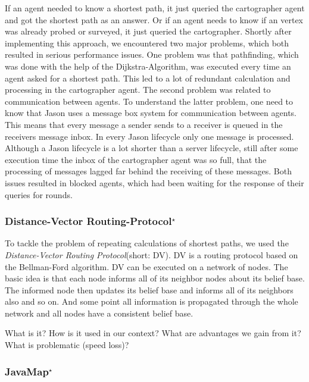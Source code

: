  If an agent needed to know a shortest path, it just queried the cartographer agent and got the shortest path as an answer. Or if an agent needs to know if an vertex was already probed or surveyed, it just queried the cartographer. Shortly after implementing this approach, we encountered two major problems, which both resulted in serious performance issues. One problem was that pathfinding, which was done with the help of the Dijkstra-Algorithm, was executed every time an agent asked for a shortest path. This led to a lot of redundant calculation and processing in the cartographer agent. The second problem was related to communication between agents. To understand the latter problem, one need to know that Jason uses a message box system for communication between agents. This means that every message a sender sends to a receiver is queued in the receivers message inbox. In every Jason lifecycle only one message is processed. Although a Jason lifecycle is a lot shorter than a server lifecycle, still after some execution time the inbox of the cartographer agent was so full, that the processing of messages lagged far behind the receiving of these messages. Both issues resulted in blocked agents, which had been waiting for the response of their queries for rounds.


\subsubsection[Distance-Vector Routing Protocol]{Distance-Vector Routing-Protocol$^\star$}\label{alg:map_dv}
To tackle the problem of repeating calculations of shortest paths, we used the \emph{Distance-Vector Routing Protocol}\cite{wiki:dvrp}(short: DV). DV is a routing protocol based on the Bellman-Ford algorithm\cite{wiki:bellman_ford}. DV can be executed on a network of nodes. The basic idea is that each node informs all of its neighbor nodes about its belief base. The informed node then updates its belief base and informs all of its neighbors also and so on. And some point all information is propagated through the whole network and all nodes have a consistent belief base.


What is it? How is it used in our context? What are advantages we gain from it? What is problematic (speed loss)?

\subsubsection[JavaMap]{JavaMap$^\star$}\label{alg:map_javamap}